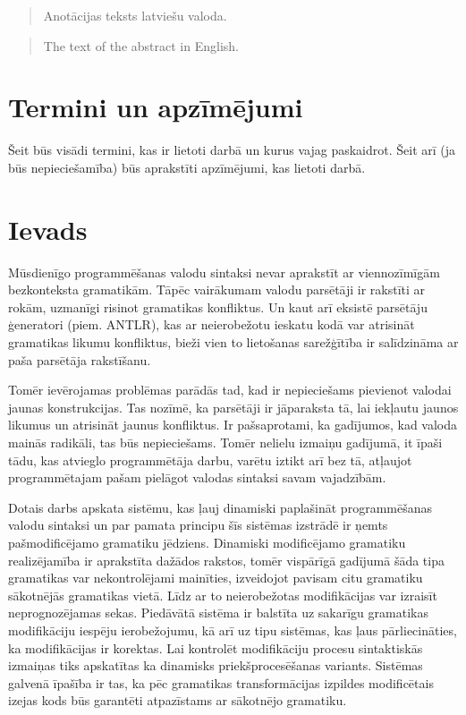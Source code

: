 \documentclass[12pt]{report}
\begin{document}
\titullapa

        \begin{abstract}
        Anotācijas teksts latviešu valoda.
        \end{abstract}
        \begin{abstract}
        The text of the abstract in English.
        \end{abstract}

\section {Termini un apzīmējumi}
Šeit būs visādi termini, kas ir lietoti darbā un kurus vajag paskaidrot.
Šeit arī (ja būs nepieciešamība) būs aprakstīti apzīmējumi, kas lietoti darbā.

\section{Ievads}

Mūsdienīgo programmēšanas valodu sintaksi nevar aprakstīt ar viennozīmīgām bezkonteksta gramatikām. Tāpēc vairākumam valodu parsētāji ir rakstīti ar rokām, uzmanīgi risinot gramatikas konfliktus. Un kaut arī eksistē parsētāju ģeneratori (piem. ANTLR), kas ar neierobežotu ieskatu kodā var atrisināt gramatikas likumu konfliktus, bieži vien to lietošanas sarežģītība ir salīdzināma ar paša parsētāja rakstīšanu.

Tomēr ievērojamas problēmas parādās tad, kad ir nepieciešams pievienot valodai jaunas konstrukcijas. Tas nozīmē, ka parsētāji ir jāparaksta tā, lai iekļautu jaunos likumus un atrisināt jaunus konfliktus. Ir pašsaprotami, ka gadījumos, kad valoda mainās radikāli, tas būs nepieciešams. Tomēr nelielu izmaiņu gadījumā, it īpaši tādu, kas atvieglo programmētāja darbu, varētu iztikt arī bez tā, atļaujot programmētajam pašam pielāgot valodas sintaksi savam vajadzībām.

Dotais darbs apskata sistēmu, kas ļauj dinamiski paplašināt programmēšanas valodu sintaksi un par pamata principu šīs sistēmas izstrādē ir ņemts pašmodificējamo gramatiku jēdziens. Dinamiski modificējamo gramatiku realizējamība ir aprakstīta dažādos rakstos, tomēr vispārīgā gadījumā šāda tipa gramatikas var nekontrolējami mainīties, izveidojot pavisam citu gramatiku sākotnējās gramatikas vietā. Līdz ar to neierobežotas modifikācijas var izraisīt neprognozējamas sekas.
Piedāvātā sistēma ir balstīta uz sakarīgu gramatikas modifikāciju iespēju ierobežojumu, kā arī uz tipu sistēmas, kas ļaus pārliecināties, ka modifikācijas ir korektas. Lai kontrolēt modifikāciju procesu sintaktiskās izmaiņas tiks apskatītas ka dinamisks priekšprocesēšanas variants. Sistēmas galvenā īpašība ir tas, ka pēc gramatikas transformācijas izpildes modificētais izejas kods būs garantēti atpazīstams ar sākotnējo gramatiku.
\end{document}

